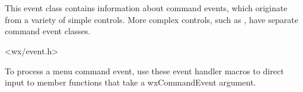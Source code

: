 \section{}\label{wxcommandevent}

This event class contains information about command events, which originate from a variety of
simple controls. More complex controls, such as , have separate command event classes.




<wx/event.h>


To process a menu command event, use these event handler macros to direct input to member
functions that take a wxCommandEvent argument.

